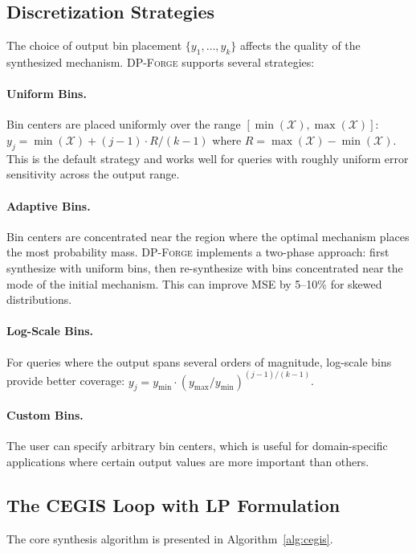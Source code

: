 \documentclass[11pt,a4paper]{article}
\newcommand{\dpforge}{\textsc{DP-Forge}}
\newcommand{\cX}{\mathcal{X}}
\begin{document}
\subsection{Discretization Strategies}
\label{subsec:discretization_strategies}

The choice of output bin placement $\{y_1, \ldots, y_k\}$ affects the quality of
the synthesized mechanism.  \dpforge{} supports several strategies:

\paragraph{Uniform Bins.}
Bin centers are placed uniformly over the range $[\min(\cX), \max(\cX)]$:
$y_j = \min(\cX) + (j-1) \cdot R/(k-1)$ where $R = \max(\cX) - \min(\cX)$.
This is the default strategy and works well for queries with roughly uniform
error sensitivity across the output range.

\paragraph{Adaptive Bins.}
Bin centers are concentrated near the region where the optimal mechanism places
the most probability mass.  \dpforge{} implements a two-phase approach: first
synthesize with uniform bins, then re-synthesize with bins concentrated near the
mode of the initial mechanism.  This can improve MSE by 5--10\% for skewed
distributions.

\paragraph{Log-Scale Bins.}
For queries where the output spans several orders of magnitude, log-scale bins
provide better coverage:
$y_j = y_{\min} \cdot (y_{\max}/y_{\min})^{(j-1)/(k-1)}$.

\paragraph{Custom Bins.}
The user can specify arbitrary bin centers, which is useful for domain-specific
applications where certain output values are more important than others.

\subsection{The CEGIS Loop with LP Formulation}
\label{subsec:cegisloop}

The core synthesis algorithm is presented in Algorithm~\ref{alg:cegis}.
\end{document}
